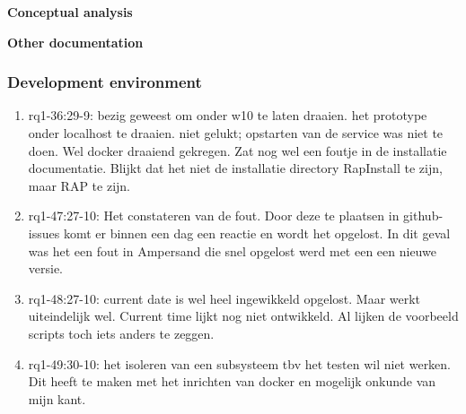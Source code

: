 \textbf{Conceptual analysis}
    

\textbf{Other documentation}

\subsubsection{Development environment}
\begin{comment}
plaats hier de afgehandelde items.
\end{comment}
\begin{enumerate}
    \item rq1-36:29-9: bezig geweest om onder w10 te laten draaien. het prototype onder localhost te draaien. niet gelukt; opstarten van de service was niet te doen. Wel docker draaiend gekregen. Zat nog wel een foutje in de installatie documentatie. Blijkt dat het niet de installatie directory RapInstall te zijn, maar RAP te zijn.
    \item rq1-47:27-10: Het constateren van de fout. Door deze te plaatsen in github-issues komt er binnen een dag een reactie en wordt het opgelost. In dit geval was het een fout in Ampersand die snel opgelost werd met een een nieuwe versie.
    \item rq1-48:27-10: current date is wel heel ingewikkeld opgelost. Maar werkt uiteindelijk wel. Current time lijkt nog niet ontwikkeld. Al lijken de voorbeeld scripts toch iets anders te zeggen.
    \item rq1-49:30-10: het isoleren van een subsysteem tbv het testen wil niet werken. Dit heeft te maken met het inrichten van docker en mogelijk onkunde van mijn kant.
    
\end{enumerate}

